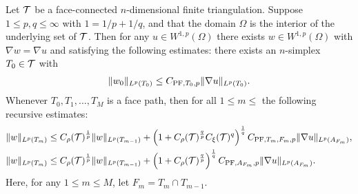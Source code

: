 \documentclass[10pt,a4paper]{article}
\begin{document}
\begin{theorem}\label{theorem:poincarefriedrichsestimate:grad}
    Let ${\mathcal T}$ be a face-connected $n$-dimensional finite triangulation. 
    Suppose $1 \leq p,q \leq \infty$ with $1 = 1/p + 1/q$,
    and that the domain $\Omega$ is the interior of the underlying set of ${\mathcal T}$. 
    Then for any $u \in W^{1,p}(\Omega)$ 
    there exists $w \in W^{1,p}(\Omega)$ with $\nabla w = \nabla u$ 
    and satisfying the following estimates:
    there exists an $n$-simplex $T_0 \in {\mathcal T}$ with 
    \begin{gather*}
        \| w_0 \|_{L^{p}(T_{0})} \leq C_{{{\rm PF}},T_{0},p} \| \nabla u \|_{L^{p}(T_{0})}.
    \end{gather*}
    Whenever $T_0, T_1, \dots, T_M$ is a face path,
    then for all $1 \leq m \leq$ the following recursive estimates:
    \begin{align*}
        \| w \|_{L^{p}(T_{m})}
        &
        \leq  
        C_\rho({\mathcal T})^{\frac 1 p} 
        \| w \|_{L^{p}(T_{m-1})} 
        + 
        \left( 1 + C_\rho({\mathcal T})^{\frac q p} C_\xi({\mathcal T})^{q} \right)^{\frac 1 q}
        C_{{\rm PF},T_{m},F_{m},p} 
        \| \nabla u \|_{L^{p}(A_{F_m})} 
        ,
        \\
        \| w \|_{L^{p}(T_m)}
        &\leq 
        C_\rho({\mathcal T})^{\frac 1 p} 
        \| w \|_{L^{p}(T_{{m-1}})}
        +
        \left( 1 + C_\rho({\mathcal T})^{\frac q p} \right)^{\frac 1 q}
        C_{{{\rm PF}},A_{F_m},p} 
        \| \nabla u \|_{L^{p}(A_{F_m})} 
        . 
    \end{align*}
    Here, for any $1 \leq m \leq M$, let $F_m = T_m \cap T_{m-1}$.
\end{theorem}
\end{document}
